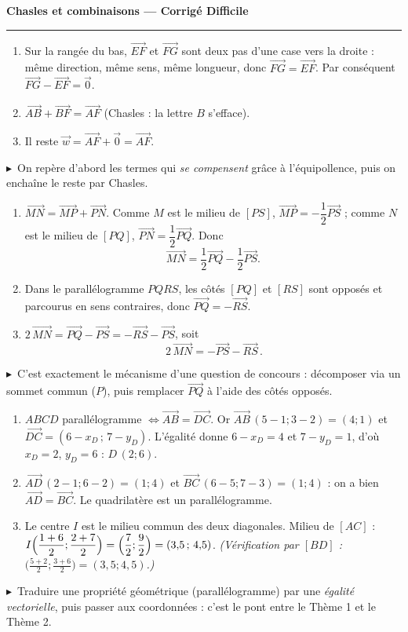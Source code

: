 \documentclass[11pt,a4paper]{article}
\newcommand{\vc}[1]{\overrightarrow{#1}}
\newcommand{\cor}[1]{\medskip\noindent{\color{primarydark}\bfseries\large Corrigé #1.}\par\smallskip}
\newcommand{\rep}{\textcolor{excol}{$\blacktriangleright$}\ }
\begin{document}
\begin{center}
{\LARGE\bfseries\color{primarydark}Chasles et combinaisons — Corrigé Difficile}\\[2pt]
{\color{primary}\rule{0.5\linewidth}{1.1pt}}
\end{center}
\vspace{2mm}

\cor{1}
\begin{enumerate}[label=\textbf{\alph*)},leftmargin=2em,itemsep=3pt]
  \item Sur la rangée du bas, $\vc{EF}$ et $\vc{FG}$ sont deux \og{}pas\fg{} d'une case vers la droite :
        même direction, même sens, même longueur, donc $\vc{FG}=\vc{EF}$. Par conséquent
        $\vc{FG}-\vc{EF}=\vec0$.
  \item $\vc{AB}+\vc{BF}=\vc{AF}$ (Chasles : la lettre $B$ s'efface).
  \item Il reste $\vec w=\vc{AF}+\vec0=\boxed{\vc{AF}}$.
\end{enumerate}
\rep On repère d'abord les termes qui \emph{se compensent} grâce à l'équipollence, puis on enchaîne le
reste par Chasles.

\cor{2}
\begin{enumerate}[label=\textbf{\alph*)},leftmargin=2em,itemsep=3pt]
  \item $\vc{MN}=\vc{MP}+\vc{PN}$. Comme $M$ est le milieu de $[PS]$, $\vc{MP}=-\dfrac12\vc{PS}$ ;
        comme $N$ est le milieu de $[PQ]$, $\vc{PN}=\dfrac12\vc{PQ}$. Donc
        \[\vc{MN}=\dfrac12\vc{PQ}-\dfrac12\vc{PS}.\]
  \item Dans le parallélogramme $PQRS$, les côtés $[PQ]$ et $[RS]$ sont opposés et parcourus en sens
        contraires, donc $\vc{PQ}=-\vc{RS}$.
  \item $2\,\vc{MN}=\vc{PQ}-\vc{PS}=-\vc{RS}-\vc{PS}$, soit
        \[\boxed{\,2\,\vc{MN}=-\vc{PS}-\vc{RS}\,}.\]
\end{enumerate}
\rep C'est exactement le mécanisme d'une question de concours : décomposer via un sommet commun ($P$),
puis remplacer $\vc{PQ}$ à l'aide des côtés opposés.

\cor{3}
\begin{enumerate}[label=\textbf{\alph*)},leftmargin=2em,itemsep=3pt]
  \item $ABCD$ parallélogramme $\iff \vc{AB}=\vc{DC}$. Or $\vc{AB}\,(5-1;3-2)=(4;1)$ et
        $\vc{DC}=(6-x_D\,;\,7-y_D)$. L'égalité donne $6-x_D=4$ et $7-y_D=1$, d'où
        $x_D=2$, $y_D=6$ : $\boxed{D\,(2;6)}$.
  \item $\vc{AD}\,(2-1;6-2)=(1;4)$ et $\vc{BC}\,(6-5;7-3)=(1;4)$ : on a bien $\vc{AD}=\vc{BC}$.
        Le quadrilatère est un parallélogramme.
  \item Le centre $I$ est le milieu commun des deux diagonales. Milieu de $[AC]$ :
        $I\Bigl(\dfrac{1+6}{2};\dfrac{2+7}{2}\Bigr)=\Bigl(\dfrac72;\dfrac92\Bigr)=(3{,}5\,;\,4{,}5)$.
        \emph{(Vérification par $[BD]$ : $\bigl(\frac{5+2}{2};\frac{3+6}{2}\bigr)=(3{,}5;4{,}5)$.)}
\end{enumerate}
\rep Traduire une propriété géométrique (parallélogramme) par une \emph{égalité vectorielle}, puis
passer aux coordonnées : c'est le pont entre le Thème 1 et le Thème 2.
\end{document}
